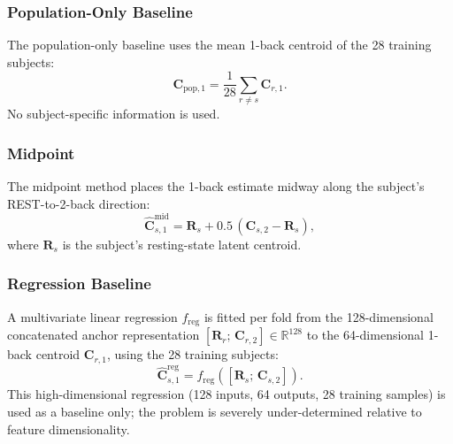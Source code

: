 \documentclass{ieeeaccess}
\begin{document}
\subsubsection{Population-Only Baseline}
The population-only baseline uses the mean 1-back centroid of the 28 training
subjects:
\begin{equation}
  \mathbf{C}_{\mathrm{pop},1}
  = \frac{1}{28} \sum_{r \neq s} \mathbf{C}_{r,1}.
\end{equation}
No subject-specific information is used.

\subsubsection{Midpoint}
The midpoint method places the 1-back estimate midway along the subject's
REST-to-2-back direction:
\begin{equation}
  \widehat{\mathbf{C}}_{s,1}^{\mathrm{mid}}
  = \mathbf{R}_s + 0.5\,(\mathbf{C}_{s,2} - \mathbf{R}_s),
\end{equation}
where $\mathbf{R}_s$ is the subject's resting-state latent centroid.

\subsubsection{Regression Baseline}
A multivariate linear regression $f_{\mathrm{reg}}$ is fitted per fold from
the 128-dimensional concatenated anchor representation
$[\mathbf{R}_r;\, \mathbf{C}_{r,2}] \in \mathbb{R}^{128}$ to the
64-dimensional 1-back centroid $\mathbf{C}_{r,1}$, using the 28 training
subjects:
\begin{equation}
  \widehat{\mathbf{C}}_{s,1}^{\mathrm{reg}}
  = f_{\mathrm{reg}}\!\left([\mathbf{R}_s;\,\mathbf{C}_{s,2}]\right).
\end{equation}
This high-dimensional regression (128 inputs, 64 outputs, 28 training
samples) is used as a baseline only; the problem is severely
under-determined relative to feature dimensionality.
\end{document}
